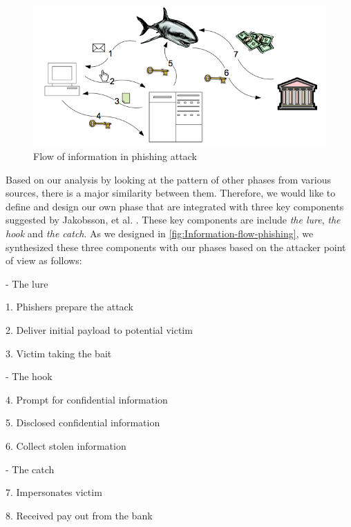 \begin{figure}
\begin{centering}
\includegraphics[scale=0.4]{gfx/emigh}\protect\caption{\label{fig:emigh}Flow of information in phishing attack \citep{emigh:2005}}

\par\end{centering}

\end{figure}


Based on our analysis by looking at the pattern of other phases from
various sources, there is a major similarity between them. Therefore,
we would like to define and design our own phase that are integrated
with three key components suggested by Jakobsson, et al. \citep{jakobsson:2006}.
These key components are include \textit{the lure},\textit{ the hook}
and \textit{the catch}. As we designed in \autoref{fig:Information-flow-phishing},
we synthesized these three components with our phases based on the
attacker point of view as follows:

- The lure 

1. Phishers prepare the attack 

2. Deliver initial payload to potential victim 

3. Victim taking the bait

- The hook 

4. Prompt for confidential information

5. Disclosed confidential information 

6. Collect stolen information 

- The catch

7. Impersonates victim 

8. Received pay out from the bank 

